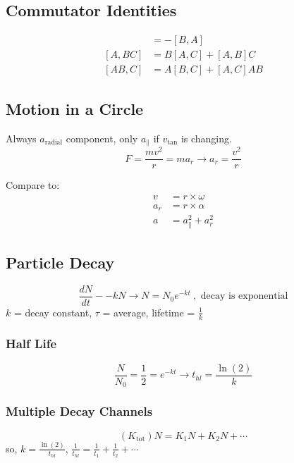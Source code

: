 \documentclass[10pt,a4paper]{article}
\begin{document}
\subsection{Commutator Identities}
\begin{align}
 [A,B] &= -[B,A] \\
 [A,BC] &= B[A,C] + [A,B]C\\
 [AB,C] &= A[B,C] + [A,C]AB
\end{align}

\subsection{Motion in a Circle}
Always $a_{\textrm{radial}}$ component, only $a_{\parallel}$ if $v_{\textrm{tan}}$ is changing.
\begin{equation}
 F = \frac{mv^2}{r} = ma_r \rightarrow a_r = \frac{v^2}{r}
\end{equation}

Compare to:
\begin{align}
 v &= r \times \omega\\
 a_r &= r \times \alpha \\
 a &= a^2_{\parallel} + a^2_r
\end{align}

\subsection{Particle Decay}
\begin{equation}
 \frac{dN}{dt} - -kN \rightarrow N = N_0 e^{-kt}~,\textrm{ decay is exponential}
\end{equation}
$k$ = decay constant, $\tau$ = average, lifetime = $\frac{1}{k}$
\subsubsection{Half Life}
\begin{equation}
 \frac{N}{N_0} = \frac{1}{2} = e^{-kt} \rightarrow t_{hl} = \frac{\ln(2)}{k}
\end{equation}

\subsubsection{Multiple Decay Channels}
\begin{equation}
 (K_{\textrm{tot}})N = K_1N + K_2N + \cdots
\end{equation}
so, $k = \frac{\ln(2)}{t_{hl}}$, $\frac{1}{t_{hl}} = \frac{1}{t_1} + \frac{1}{t_2} + \cdots$
\end{document}
